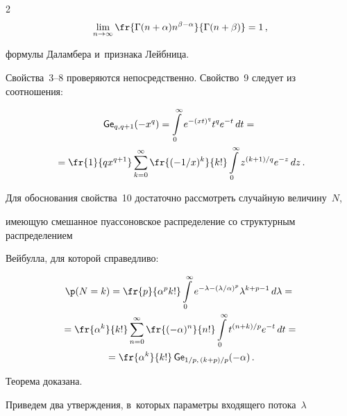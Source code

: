 \begin{multicols}{2}
$$


\lim\limits_{n \to \infty}


\fr{\Gamma(n+\alpha)n^{\beta-\alpha}}{{\Gamma(n+\beta)}}=1\,,


$$


формулы Даламбера и~признака Лейбница.


Свойства~3--8 проверяются непосредственно. Свойство~9 следует из соотношения:


\begin{multline*}


\G_{q, q+1}(-x^q)= \int\limits_0^\infty e^{-(xt)^{q}} t^q e^{-t}\, dt={}\\


{}=


\fr{1}{{qx^{q+1}}}\sum\limits_{k=0}^\infty


\fr{(-1/x)^k}{{k!}}\int\limits_0^\infty z^{(k+1)/q}e^{-z}\, dz\,.


\end{multline*}


Для обоснования свойства~10 достаточно рас\-смот\-реть случайную величину~$N$, 


имеющую смешанное пуассоновское распределение со структурным распределением 


Вейбулла, для которой справедливо:


\begin{multline*}


\p(N=k) = \fr{p}{{\alpha^p k!}} \int\limits_0^\infty 


e^{-\lambda -(\lambda/\alpha)^p} \lambda^{k+p-1} \, d\lambda={}\\


{}= \fr{\alpha^k}{k!} \sum\limits_{n=0}^\infty 


\fr{(-\alpha)^n}{{n!}} \int\limits_0^\infty t^{(n+k)/p} e^{-t} \, dt


= {}\\


{}=\fr{\alpha^k}{k!}\, \G_{1/p,\, (k+p)/p}(- \alpha)\,.


\end{multline*}





Теорема доказана.





\smallskip





Приведем два утверждения, в~которых па\-ра\-мет\-ры входящего потока~$\lambda$ 



\end{multicols}
